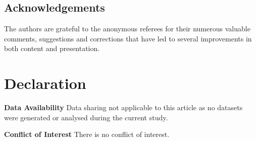 \documentclass[a4paper, oneside]{amsart}
\numberwithin{equation}{section}
\theoremstyle{definition}
\theoremstyle{remark}
\begin{document}
\subsection*{Acknowledgements} The authors are grateful to the anonymous referees  for their  numerous valuable comments, suggestions and corrections that have led to several improvements in both content and presentation.
\section*{Declaration}\noindent\textbf{Data Availability} Data sharing not applicable to this article as no datasets were generated or analysed during the current study.

\noindent\textbf{Conflict of Interest} There is no conflict of interest.
\end{document}
